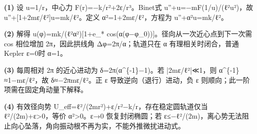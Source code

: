 \par\noindent\textbf{(1)} 设 u=1/r，中心力 F(r)=−k/r²+2ε/r³。Binet式 u''+u=−mF(1/u)/(ℓ²u²)，故 u''+[1+2mε/ℓ²]u=mk/ℓ²。定义 α²=1+2mε/ℓ²，方程为 u''+α²u=mk/ℓ²。
\par\noindent\textbf{(2)} 解得 u(φ)=mk/(ℓ²α²)[1+e\_* cos(α(φ−φ\_0))]。径向从一次近心点到下一次需 cos 相位增加 2π，因此拱线角 Δφ=2π/α；轨道只在 α 有理相关时闭合，普通Kepler ε=0时 α=1。
\par\noindent\textbf{(3)} 每周相对 2π 的近心进动为 δ=2π(α\textasciicircum{}\{-1\}−1)。若 |2mε/ℓ²|≪1，则 α\textasciicircum{}\{-1\}≈1−mε/ℓ²，故 δ≈−2πmε/ℓ²。正 ε 导致逆向（退行）进动，负 ε 则顺向；此一阶项需在固定角动量下解释。
\par\noindent\textbf{(4)} 有效径向势 U\_eff=ℓ²/(2mr²)+ε/r²−k/r，存在稳定圆轨道仅当 ℓ²/(2m)+ε>0，等价 α²>0。ε→0 恢复封闭椭圆；若 ε≤−ℓ²/(2m)，离心势无法阻止向心坠落，角向振动根不再为实，不能外推微扰进动式。
